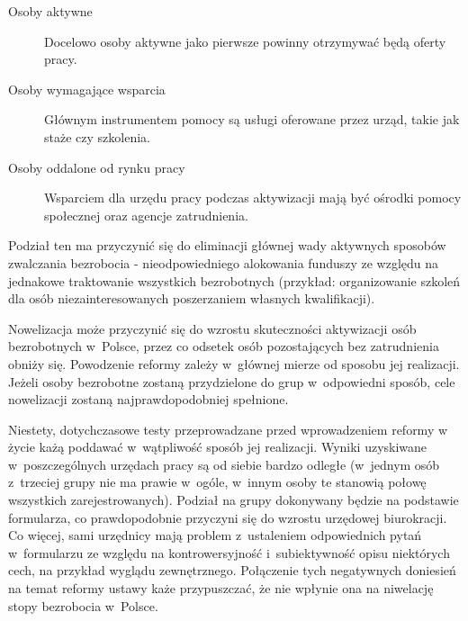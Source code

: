 \documentclass[12pt]{article}
\begin{document}
    \begin{description}
        \item[Osoby aktywne] Docelowo osoby aktywne jako pierwsze powinny otrzymywać będą oferty pracy. 
        \item[Osoby wymagające wsparcia] Głównym instrumentem pomocy są usługi oferowane przez urząd, takie jak staże czy szkolenia.
        \item[Osoby oddalone od rynku pracy] Wsparciem dla urzędu pracy podczas aktywizacji mają być ośrodki pomocy społecznej oraz agencje zatrudnienia.
    \end{description}

    Podział ten ma przyczynić się do eliminacji głównej wady aktywnych sposobów zwalczania bezrobocia - nieodpowiedniego alokowania funduszy ze względu na jednakowe traktowanie wszystkich bezrobotnych (przykład: organizowanie szkoleń dla osób niezainteresowanych poszerzaniem własnych kwalifikacji). 
    
    Nowelizacja może przyczynić się do wzrostu skuteczności aktywizacji osób bezrobotnych w~Polsce, przez co odsetek osób pozostających bez zatrudnienia obniży się. Powodzenie reformy zależy w~głównej mierze od sposobu jej realizacji. Jeżeli osoby bezrobotne zostaną przydzielone do grup w~odpowiedni sposób, cele nowelizacji zostaną najprawdopodobniej spełnione. 
    
    Niestety, dotychczasowe testy przeprowadzane przed wprowadzeniem reformy w życie każą poddawać w~wątpliwość sposób jej realizacji. Wyniki uzyskiwane w~poszczególnych urzędach pracy są od siebie bardzo odległe (w~jednym osób z~trzeciej grupy nie ma prawie w~ogóle, w~innym osoby te stanowią połowę wszystkich zarejestrowanych). Podział na grupy dokonywany będzie na podstawie formularza, co prawdopodobnie przyczyni się do wzrostu urzędowej biurokracji. Co więcej, sami urzędnicy mają problem z~ustaleniem odpowiednich pytań w~formularzu ze względu na kontrowersyjność i~subiektywność opisu niektórych cech, na przykład wyglądu zewnętrznego. Połączenie tych negatywnych doniesień na temat reformy ustawy każe przypuszczać, że nie wpłynie ona na niwelację stopy bezrobocia w~Polsce.
        
\end{document}
